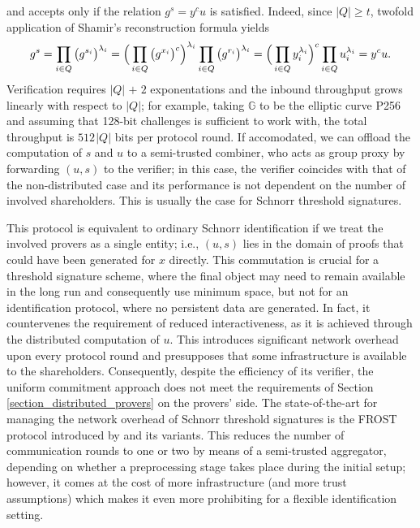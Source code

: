 \documentclass[10pt, psamsfonts, reqno]{amsart}
\theoremstyle{definition}
\theoremstyle{remark}
\numberwithin{equation}{section}
\begin{document}
and accepts only if the relation
$g ^ s = y ^ c u$ is satisfied.
Indeed, since $|Q| \ge t$,
twofold application of Shamir's reconstruction formula yields
\vspace{5pt}
\begin{equation*}
g ^ s =
\prod_{i \in Q} \big(g ^ {s_i}\big)^{\lambda_i} =
\Big(\prod_{i \in Q}\big(g ^ {x_i}\big)^c\Big)^{\lambda_i} \prod_{i \in Q}\big(g ^ {r_i}\big) ^ {\lambda_i} =
\Big(\prod_{i \in Q}y_i^{\lambda_i}\Big)^c \prod_{i \in Q}u_i^{\lambda_i}=
y^c u.
\vspace{5pt}
\end{equation*}
Verification requires $|Q|\hspace{1pt} +\hspace{1pt} 2$
exponentations
and the inbound throughput grows linearly
with respect to $|Q|$; for example,
taking $\mathbb{G}$ to be the elliptic curve P256
and assuming that 128-bit challenges is sufficient to work with,
the total throughput is $512 \hspace{1pt} |Q|$ bits per protocol
round. If accomodated, we can offload the computation of $s$ and $u$
to a semi-trusted combiner,
who acts as group proxy by forwarding $(u, s)$ to the verifier;
in this case, the verifier coincides with that of the
non-distributed case and its performance
is not dependent on the number of involved shareholders.
This is usually the case for Schnorr threshold signatures.

This protocol is equivalent to ordinary Schnorr identification
if we treat the involved provers as a single entity;
i.e., $(u, s)$ lies in the domain
of proofs that could have been generated
for $x$ directly.
This commutation is crucial for
a threshold signature scheme,
where the final object may need to
remain available in the long run
and consequently use minimum space,
but not for an identification protocol,
where no persistent data are generated.
In fact, it countervenes the requirement
of reduced interactiveness, as it is achieved through
the distributed computation of $u$.
This introduces significant
network overhead upon every protocol round and
presupposes that some infrastructure is available
to the shareholders.
Consequently, despite the efficiency of its verifier,
the uniform commitment approach does not meet the requirements
of Section \ref{section_distributed_provers} on the provers' side.
The state-of-the-art for managing the network overhead
of Schnorr threshold signatures
is the FROST protocol introduced by \cite{paper_frost}
and its variants.
This reduces the number of communication rounds
to one or two by means of a semi-trusted aggregator,
depending on whether
a preprocessing stage takes place during the initial setup;
however, it comes at the cost of more
infrastructure (and more trust assumptions)
which makes it even more
prohibiting for a flexible identification setting.
\end{document}
